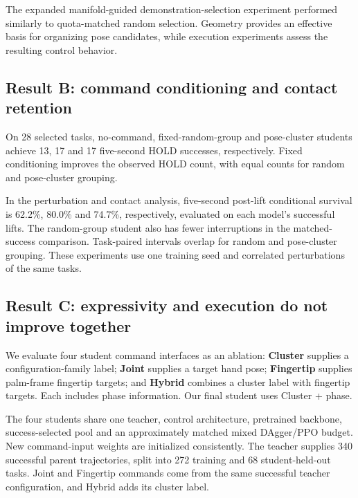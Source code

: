 \documentclass[10pt,twocolumn]{article}
\begin{document}
The expanded manifold-guided demonstration-selection experiment performed similarly to quota-matched random selection. Geometry provides an effective basis for organizing pose candidates, while execution experiments assess the resulting control behavior.

\subsection{Result B: command conditioning and contact retention}

On 28 selected tasks, no-command, fixed-random-group and pose-cluster students achieve 13, 17 and 17 five-second HOLD successes, respectively. Fixed conditioning improves the observed HOLD count, with equal counts for random and pose-cluster grouping.

In the perturbation and contact analysis, five-second post-lift conditional survival is 62.2\%, 80.0\% and 74.7\%, respectively, evaluated on each model's successful lifts. The random-group student also has fewer interruptions in the matched-success comparison. Task-paired intervals overlap for random and pose-cluster grouping. These experiments use one training seed and correlated perturbations of the same tasks.

\subsection{Result C: expressivity and execution do not improve together}

We evaluate four student command interfaces as an ablation: \textbf{Cluster} supplies a configuration-family label; \textbf{Joint} supplies a target hand pose; \textbf{Fingertip} supplies palm-frame fingertip targets; and \textbf{Hybrid} combines a cluster label with fingertip targets. Each includes phase information. Our final student uses Cluster + phase.

The four students share one teacher, control architecture, pretrained backbone, success-selected pool and an approximately matched mixed DAgger/PPO budget. New command-input weights are initialized consistently. The teacher supplies 340 successful parent trajectories, split into 272 training and 68 student-held-out tasks. Joint and Fingertip commands come from the same successful teacher configuration, and Hybrid adds its cluster label.
\end{document}
